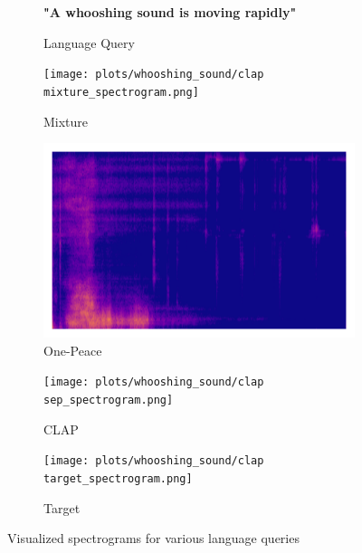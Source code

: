 \begin{figure}[htbp]
    \begin{subfigure}[b]{0.185\textwidth}
        \centering
        \scriptsize\textbf{"A whooshing sound is moving rapidly"}
        \vspace{5.0mm}
        \caption*{Language Query}
    \end{subfigure}
    \begin{subfigure}[b]{0.185\textwidth}
        \centering
        \texttt{[image: plots/whooshing\_sound/clap mixture\_spectrogram.png]}
        \centering
        \caption*{Mixture}
    \end{subfigure}
    \begin{subfigure}[b]{0.185\textwidth}
        \centering
        \includegraphics[width=\textwidth]{plots/whooshing_sound/onepeace sep_spectrogram.png}
        \caption*{One-Peace}
    \end{subfigure}
    \begin{subfigure}[b]{0.185\textwidth}
        \centering
        \texttt{[image: plots/whooshing\_sound/clap sep\_spectrogram.png]}
        \caption*{CLAP}
    \end{subfigure}
    \begin{subfigure}[b]{0.185\textwidth}
        \centering
        \texttt{[image: plots/whooshing\_sound/clap target\_spectrogram.png]}
        \caption*{Target}
    \end{subfigure}
    
    \caption{Visualized spectrograms for various language queries}
    
    \label{fig:separation_results}

\end{figure}
